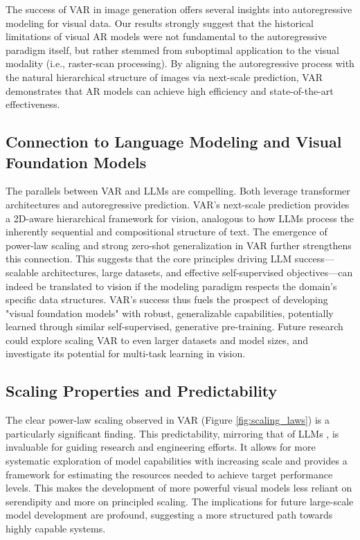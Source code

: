 \documentclass{article}
\begin{document}
The success of VAR in image generation offers several insights into autoregressive modeling for visual data. Our results strongly suggest that the historical limitations of visual AR models were not fundamental to the autoregressive paradigm itself, but rather stemmed from suboptimal application to the visual modality (i.e., raster-scan processing). By aligning the autoregressive process with the natural hierarchical structure of images via next-scale prediction, VAR demonstrates that AR models can achieve high efficiency and state-of-the-art effectiveness.

\subsection{Connection to Language Modeling and Visual Foundation Models}
The parallels between VAR and LLMs are compelling. Both leverage transformer architectures and autoregressive prediction. VAR's next-scale prediction provides a 2D-aware hierarchical framework for vision, analogous to how LLMs process the inherently sequential and compositional structure of text. The emergence of power-law scaling and strong zero-shot generalization in VAR further strengthens this connection. This suggests that the core principles driving LLM success—scalable architectures, large datasets, and effective self-supervised objectives—can indeed be translated to vision if the modeling paradigm respects the domain's specific data structures. VAR's success thus fuels the prospect of developing "visual foundation models" with robust, generalizable capabilities, potentially learned through similar self-supervised, generative pre-training. Future research could explore scaling VAR to even larger datasets and model sizes, and investigate its potential for multi-task learning in vision.

\subsection{Scaling Properties and Predictability}
The clear power-law scaling observed in VAR (Figure \ref{fig:scaling_laws}) is a particularly significant finding. This predictability, mirroring that of LLMs \cite{kaplan2020scaling}, is invaluable for guiding research and engineering efforts. It allows for more systematic exploration of model capabilities with increasing scale and provides a framework for estimating the resources needed to achieve target performance levels. This makes the development of more powerful visual models less reliant on serendipity and more on principled scaling. The implications for future large-scale model development are profound, suggesting a more structured path towards highly capable systems.
\end{document}
